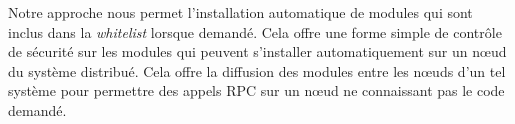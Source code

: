 Notre approche nous permet l'installation automatique de modules qui sont
inclus dans la \textit{whitelist} lorsque demandé.  Cela offre une forme simple
de contrôle de sécurité sur les modules qui peuvent s'installer automatiquement
sur un nœud du système distribué. Cela offre la diffusion des modules entre les
nœuds d'un tel système pour permettre des appels RPC sur un nœud ne connaissant
pas le code demandé.








